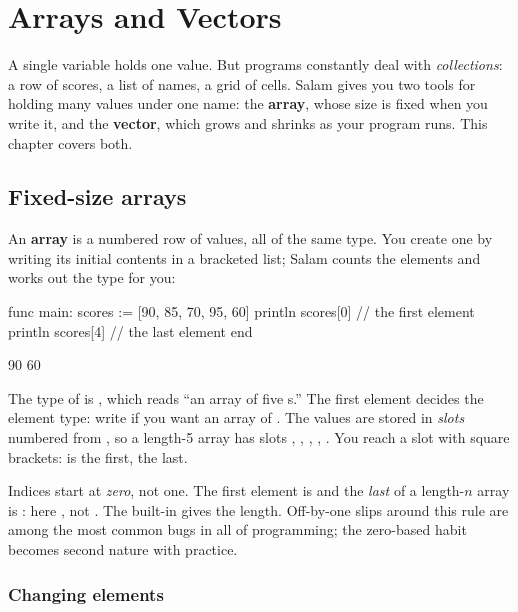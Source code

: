 \chapter{Arrays and Vectors}%
\label{ch:arrays-vectors}

A single variable holds one value. But programs constantly deal with
\emph{collections}: a row of scores, a list of names, a grid of cells. Salam
gives you two tools for holding many values under one name: the \textbf{array},
whose size is fixed when you write it, and the \textbf{vector}, which grows and
shrinks as your program runs. This chapter covers both.

\section{Fixed-size arrays}

An \textbf{array} is a numbered row of values, all of the same type. You create
one by writing its initial contents in a bracketed list; Salam counts the
elements and works out the type for you:

\begin{salamen}
func main:
    scores := [90, 85, 70, 95, 60]
    println scores[0]      // the first element
    println scores[4]      // the last element
end
\end{salamen}

\begin{progout}
90
60
\end{progout}

The type of  is , which reads ``an array of five
s.'' The first element decides the element type: write
\code{[90 as i64, 85, 70]} if you want an array of . The values are
stored in \emph{slots} numbered from , so a length-5 array has slots
, , , , . You reach a slot with square
brackets:  is the first,  the last.

\begin{warn}
Indices start at \emph{zero}, not one. The first element is  and
the \emph{last} of a length-$n$ array is : here
, not . The built-in  gives
the length. Off-by-one slips around this rule are
among the most common bugs in all of programming; the zero-based habit becomes
second nature with practice.
\end{warn}

\subsection{Changing elements}

